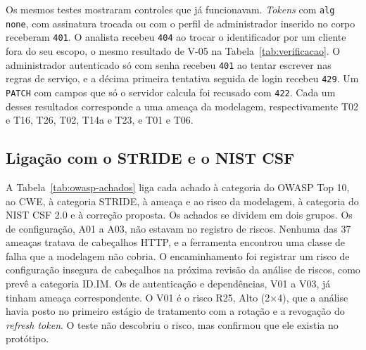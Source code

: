 \documentclass[conference]{IEEEtran}
\begin{document}
Os mesmos testes mostraram controles que já funcionavam. \textit{Tokens} com \texttt{alg} \texttt{none}, com assinatura trocada ou com o perfil de administrador inserido no corpo receberam \texttt{401}. O analista recebeu \texttt{404} ao trocar o identificador por um cliente fora do seu escopo, o mesmo resultado de V-05 na Tabela~\ref{tab:verificacao}. O administrador autenticado só com senha recebeu \texttt{401} ao tentar escrever nas regras de serviço, e a décima primeira tentativa seguida de login recebeu \texttt{429}. Um \texttt{PATCH} com campos que só o servidor calcula foi recusado com \texttt{422}. Cada um desses resultados corresponde a uma ameaça da modelagem, respectivamente T02 e T16, T26, T02, T14a e T23, e T01 e T06.

\subsection{Ligação com o STRIDE e o NIST CSF}
\label{subsec:owasp-ligacao}

A Tabela~\ref{tab:owasp-achados} liga cada achado à categoria do OWASP Top 10, ao CWE, à categoria STRIDE, à ameaça e ao risco da modelagem, à categoria do NIST CSF 2.0 e à correção proposta. Os achados se dividem em dois grupos. Os de configuração, A01 a A03, não estavam no registro de riscos. Nenhuma das 37 ameaças tratava de cabeçalhos HTTP, e a ferramenta encontrou uma classe de falha que a modelagem não cobria. O encaminhamento foi registrar um risco de configuração insegura de cabeçalhos na próxima revisão da análise de riscos, como prevê a categoria ID.IM. Os de autenticação e dependências, V01 a V03, já tinham ameaça correspondente. O V01 é o risco R25, Alto (2$\times$4), que a análise havia posto no primeiro estágio de tratamento com a rotação e a revogação do \textit{refresh token}. O teste não descobriu o risco, mas confirmou que ele existia no protótipo.
\end{document}
